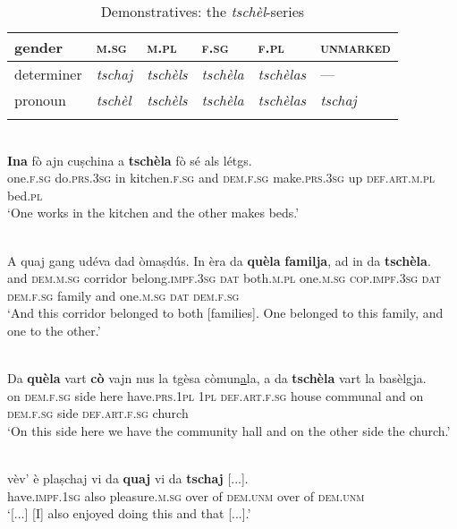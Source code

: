 \begin{table}
\caption{Demonstratives: the \textit{tschèl}-series}
\label{demtschel}
 \begin{tabular}{llllll}
  \lsptoprule
    gender        & \textsc{m.sg} & \textsc{m.pl} & \textsc{f.sg} & \textsc{f.pl} & \textsc{unmarked}\\
  \midrule
  determiner  & \textit{tschaj} &  \textit{tschèls}  & \textit{tschèla}  & \textit{tschèlas} & ---\\
  pronoun  & \textit{tschèl} & \textit{tschèls} & \textit{tschèla} & \textit{tschèlas} & \textit{tschaj}\\
  \lspbottomrule
 \end{tabular}
\end{table}

\ea\label{}
\\
\gll \textbf{Ina} fò ajn cuṣchina a \textbf{tschèla} fò sé als létgs.\\
  one.\textsc{f.sg} do.\textsc{prs.3sg} in kitchen.\textsc{f.sg} and \textsc{dem.f.sg} make.\textsc{prs.3sg} up \textsc{def.art.m.pl} bed.\textsc{pl}\\
\glt `One works in the kitchen and the other makes beds.'
\z

\ea\label{}
\\
\gll    A quaj gang udéva dad òmaṣdús.  In èra da \textbf{quèla} \textbf{familja}, ad in da \textbf{tschèla}.\\
and \textsc{dem.m.sg} corridor belong.\textsc{impf.3sg} \textsc{dat}  both.\textsc{m.pl} one.\textsc{m.sg} \textsc{cop.impf.3sg} \textsc{dat}  \textsc{dem.f.sg} family and one.\textsc{m.sg} \textsc{dat} \textsc{dem.f.sg}\\
\glt `And this corridor belonged to both [families]. One belonged to this family, and one to the other.'
\z

\ea\label{}
\\
\gll Da \textbf{quèla} vart \textbf{cò} vajn nus la tgèsa còmun\underline{a}la, a da \textbf{tschèla} vart la basèlgja.\\
on \textsc{dem.f.sg} side here have.\textsc{prs.1pl} \textsc{1pl} \textsc{def.art.f.sg} house communal and on \textsc{dem.f.sg} side \textsc{def.art.f.sg} church\\
\glt`On this side here we have the community hall and on the other side the church.'
\z

\ea\label{}
\\
\gll [...] vèv' è plaṣchaj vi da \textbf{quaj} vi da \textbf{tschaj} [...].\\
{} have.\textsc{impf.1sg} also pleasure.\textsc{m.sg} over of \textsc{dem.unm} over of \textsc{dem.unm}\\
\glt `[...] [I] also enjoyed doing this and that [...].'
\z

